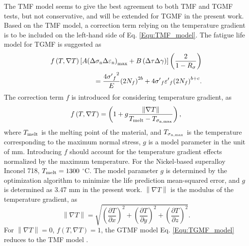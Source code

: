 \documentclass[preprint,5p,twocolumn,10pt,sort&compress]{elsarticle}
\begin{document}
The TMF model \cite{SUN2019228} seems to give the best agreement to both TMF and TGMF tests, but not conservative, and will be extended for TGMF in the present work.
Based on the TMF model, a correction term relying on the temperature gradient is to be included on the left-hand side of Eq. \eqref{Equ:TMF_model}. The fatigue life model for TGMF is suggested as
\begin{equation}
\begin{aligned}
f\left( {T,\nabla T} \right)\left[ {A{{\left( {\Delta {\sigma _{\rm n}}\Delta {\varepsilon _{\rm n}}} \right)}_{\max }} + B\left( {\Delta \tau \Delta \gamma } \right)} \right]\left( {\frac{2}{{1 - {R_\sigma }}}} \right) \\ 
= \frac{{4{{\sigma '}_f}^2}}{E}{\left( {2{N_f}} \right)^{2b}} + 4{{\sigma '}_f}{{\varepsilon '}_f}{\left( {2{N_f}} \right)^{b + c}}.
\end{aligned}
\label{Equ:TGMF_model}
\end{equation}
The correction term $f$ is introduced for considering temperature gradient, as
\begin{equation}
f\left( {T,\nabla T} \right) = \left( {1 + g\frac{{\left\| {\nabla T} \right\|}}{{{T_{{\rm{melt}}}} - {T_{{\sigma _{\rm n,\max }}}}}}} \right),
\label{Equ:TGMF_term}
\end{equation}
where ${T_{{\rm{melt}}}}$ is the melting point of the material, and ${T_{{\sigma _{\rm n,\max }}}}$ is the temperature corresponding to the maximum normal stress, $g$ is a model parameter in the unit of mm. Introducing $f$ should account for the temperature gradient effects normalized by the maximum temperature. For the Nickel-based superalloy Inconel 718, ${T_{{\rm{melt}}}}=1300$ $^\circ$C. The model parameter $g$ is determined by the optimization algorithm to minimize the life prediction
mean-squared error, and $g$ is determined as 3.47 mm in the present work. ${\left\| {\nabla T} \right\|}$ is the modulus of the temperature gradient, as
\begin{equation}
\left\| {\nabla T} \right\| = \sqrt {{{\left( {\frac{{\partial T}}{{\partial x}}} \right)}^2} + {{\left( {\frac{{\partial T}}{{\partial y}}} \right)}^2} + {{\left( {\frac{{\partial T}}{{\partial z}}} \right)}^2}}.
\end{equation}
For $\left\| {\nabla T} \right\|=0$, $f\left( {T,\nabla T} \right)=1$, the GTMF model Eq. \eqref{Equ:TGMF_model} reduces to the TMF model \cite{SUN2019228}.
\end{document}
